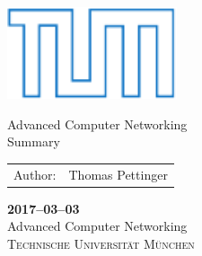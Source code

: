 \documentclass{article}
\begin{document}
\setcounter{tocdepth}{2} %


\begin{titlepage}
  \centering\includegraphics[width=5cm]{figures/tumlogo}

  \vspace{2.5cm}
  \Huge{Advanced Computer Networking} \\
  \vspace{0.1in}\huge{Summary}\\

  \Large
  \vspace{1.5cm}
  \begin{tabularx}{9cm}{r l}
    Author: & Thomas Pettinger\\
  \end{tabularx}

  \vfill
  \textbf{2017--03--03} \\
  \vspace{0.3in}\normalsize{Advanced Computer Networking}\\
  \vspace{0.03in}\normalsize{\textsc{Technische Universität München}}\\
  \vspace{1cm}

\end{titlepage}


\newpage
\thispagestyle{empty}
\tableofcontents

\newpage
{}


\newpage


\newpage


\newpage


\newpage


\newpage


\newpage


\newpage


\newpage


\newpage

\end{document}
